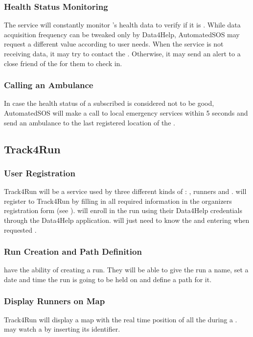 \documentclass[../../rasd.tex]{subfiles}
\begin{document}
				\subsubsection{Health Status Monitoring}
				The service will constantly monitor 's health data to verify if it is . While data acquisition frequency can be tweaked only by Data4Help, AutomatedSOS may request a different value according to user needs.  When the service is not receiving data, it may try to contact the . Otherwise, it may send an alert to a close friend of the  for them to check in.
				
				\subsubsection{Calling an Ambulance} 
				In case the health status of a subscribed  is considered not to be good, AutomatedSOS will make a call to local emergency services within 5 seconds and send an ambulance to the last registered location of the .

			\subsection{Track4Run}
				
				\subsubsection{User Registration}
				Track4Run will be a service used by three different kinds of : , runners and . will register to Track4Run by filling in all required information in the organizers registration form (see ).  will enroll in the run using their Data4Help credentials through the Data4Help application.  will just need to know the  and entering when requested .
				
				\subsubsection{Run Creation and Path Definition}
				 have the ability of creating a run. They will be able to give the run a name, set a date and time the run is going to be held on and define a path for it.
				
				\subsubsection{Display Runners on Map}

				Track4Run will display a map with the real time position of all the  during a .  may watch a  by inserting its identifier.
\end{document}
